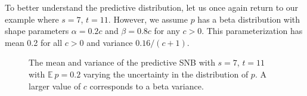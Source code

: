 \documentclass[review]{elsarticle}
\begin{document}

To better understand the predictive distribution, let us once again return to 
our example where $s=7$, $t=11$. However, we assume $p$ has a beta distribution
with shape parameters $\alpha = 0.2 c$ and $\beta = 0.8 c$ for any $c > 0$.
This parameterization has mean 0.2 for all $c > 0$ and variance 
$0.16 / (c+1)$.


\begin{figure}[h!]
\centering
{}
\hfill
{}
\caption{
The mean and variance of the predictive SNB with $s=7$, $t=11$
with $\mathbb{E}\ p = 0.2$ varying the uncertainty 
in the distribution of $p$. A larger value of $c$
corresponds to a beta variance.
}
\label{fig:bayesian-sample-size}
\end{figure}
\end{document}
